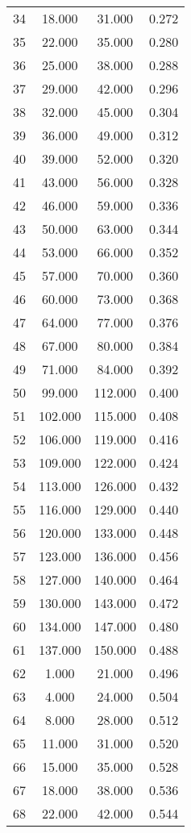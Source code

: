 \begin{tabular}{cccc}
  34 & 18.000 & 31.000 & 0.272 \\ 
  35 & 22.000 & 35.000 & 0.280 \\ 
  36 & 25.000 & 38.000 & 0.288 \\ 
  37 & 29.000 & 42.000 & 0.296 \\ 
  38 & 32.000 & 45.000 & 0.304 \\ 
  39 & 36.000 & 49.000 & 0.312 \\ 
  40 & 39.000 & 52.000 & 0.320 \\ 
  41 & 43.000 & 56.000 & 0.328 \\ 
  42 & 46.000 & 59.000 & 0.336 \\ 
  43 & 50.000 & 63.000 & 0.344 \\ 
  44 & 53.000 & 66.000 & 0.352 \\ 
  45 & 57.000 & 70.000 & 0.360 \\ 
  46 & 60.000 & 73.000 & 0.368 \\ 
  47 & 64.000 & 77.000 & 0.376 \\ 
  48 & 67.000 & 80.000 & 0.384 \\ 
  49 & 71.000 & 84.000 & 0.392 \\ 
  50 & 99.000 & 112.000 & 0.400 \\ 
  51 & 102.000 & 115.000 & 0.408 \\ 
  52 & 106.000 & 119.000 & 0.416 \\ 
  53 & 109.000 & 122.000 & 0.424 \\ 
  54 & 113.000 & 126.000 & 0.432 \\ 
  55 & 116.000 & 129.000 & 0.440 \\ 
  56 & 120.000 & 133.000 & 0.448 \\ 
  57 & 123.000 & 136.000 & 0.456 \\ 
  58 & 127.000 & 140.000 & 0.464 \\ 
  59 & 130.000 & 143.000 & 0.472 \\ 
  60 & 134.000 & 147.000 & 0.480 \\ 
  61 & 137.000 & 150.000 & 0.488 \\ 
  62 & 1.000 & 21.000 & 0.496 \\ 
  63 & 4.000 & 24.000 & 0.504 \\ 
  64 & 8.000 & 28.000 & 0.512 \\ 
  65 & 11.000 & 31.000 & 0.520 \\ 
  66 & 15.000 & 35.000 & 0.528 \\ 
  67 & 18.000 & 38.000 & 0.536 \\ 
  68 & 22.000 & 42.000 & 0.544 \\ 

\end{tabular}
